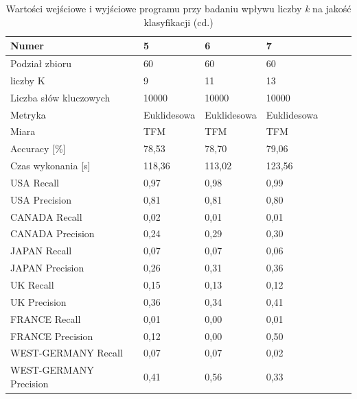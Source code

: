 \documentclass{classrep}
\begin{document}
{{               \begin{table}[!htbp]
                \centering
                \begin{tabular}{|l|l|l|l|l|l|l|}
                    \hline
                    Numer                    & 5            & 6           & 7           \\ \hline
                    Podział zbioru           & 60			& 60		  & 60		    \\ \hline
                    liczby K                 & 9			& 11		  & 13		    \\ \hline
                    Liczba słów kluczowych   & 10000		& 10000		  & 10000		\\ \hline
                    Metryka                	 & Euklidesowa	& Euklidesowa & Euklidesowa	\\ \hline
                    Miara                    & TFM			& TFM		  & TFM		    \\ \hline
                    Accuracy {[}\%{]}        & 78,53		& 78,70		  & 79,06		\\ \hline
                    Czas wykonania {[}s{]}   & 118,36	    & 113,02	  & 123,56	    \\ \hline
                    USA Recall               & 0,97		    & 0,98		  & 0,99		\\ \hline
                    USA Precision            & 0,81		    & 0,81		  & 0,80		\\ \hline
                    CANADA Recall            & 0,02		    & 0,01		  & 0,01		\\ \hline
                    CANADA Precision         & 0,24		    & 0,29		  & 0,30		\\ \hline
                    JAPAN Recall             & 0,07		    & 0,07		  & 0,06		\\ \hline
                    JAPAN Precision          & 0,26		    & 0,31		  & 0,36		\\ \hline
                    UK Recall                & 0,15		    & 0,13		  & 0,12		\\ \hline
                    UK Precision             & 0,36		    & 0,34		  & 0,41		\\ \hline
                    FRANCE Recall            & 0,01		    & 0,00		  & 0,01		\\ \hline
                    FRANCE Precision         & 0,12		    & 0,00		  & 0,50		\\ \hline
                    WEST-GERMANY Recall      & 0,07		    & 0,07		  & 0,02		\\ \hline
                    WEST-GERMANY Precision   & 0,41		    & 0,56		  & 0,33		\\ \hline
                    \end{tabular}
                    \caption{Wartości wejściowe i wyjściowe programu przy badaniu wpływu liczby \emph{k} na jakość klasyfikacji (cd.)} \label{table-k2}
                \end{table}
                \FloatBarrier

}}
\end{document}
